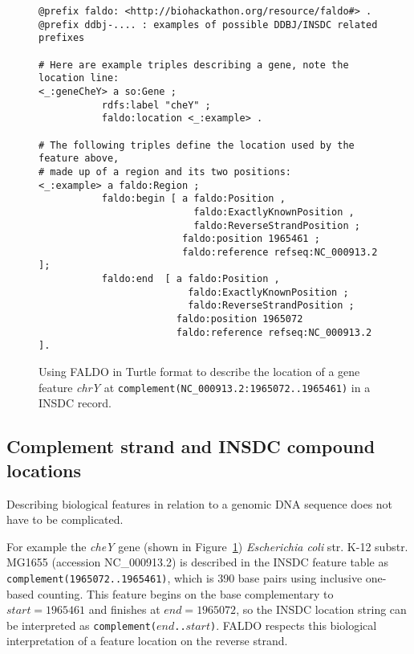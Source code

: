 %
\begin{figure}
\begin{shaded}
\small
\begin{verbatim} 
@prefix faldo: <http://biohackathon.org/resource/faldo#> .
@prefix ddbj-.... : examples of possible DDBJ/INSDC related prefixes

# Here are example triples describing a gene, note the location line:
<_:geneCheY> a so:Gene ;
           rdfs:label "cheY" ;
           faldo:location <_:example> .

# The following triples define the location used by the feature above,
# made up of a region and its two positions:
<_:example> a faldo:Region ;
           faldo:begin [ a faldo:Position ,
                           faldo:ExactlyKnownPosition ,
                           faldo:ReverseStrandPosition ;
                         faldo:position 1965461 ;
                         faldo:reference refseq:NC_000913.2 ];
           faldo:end  [ a faldo:Position ,
                          faldo:ExactlyKnownPosition ;
                          faldo:ReverseStrandPosition ;
                        faldo:position 1965072
                        faldo:reference refseq:NC_000913.2 ].
\end{verbatim}
\end{shaded}
\caption{Using FALDO in Turtle\cite{TurtleFormatSpec} format to describe the location of a
gene feature \textit{chrY} at \texttt{complement(NC\_000913.2:1965072..1965461)} in a INSDC record.}
\label{fig:insdcComplement}
\end{figure}


\subsection*{Complement strand and INSDC compound locations}

Describing biological features in relation to a genomic DNA sequence does not have to be complicated.

For example the \textit{cheY} gene (shown in Figure~\ref{fig:insdcComplement})
\textit{Escherichia coli} str. K-12 substr. MG1655 (accession NC\_000913.2)
is described in the INSDC feature table as \texttt{complement(1965072..1965461)},
which is 390 base pairs using inclusive one-based counting.
This feature begins on the base complementary to $start = 1965461$
and finishes at $end = 1965072$, so the INSDC location string
can be interpreted as \texttt{complement($end$..$start$)}.
FALDO respects this biological interpretation of a feature location
on the reverse strand.

